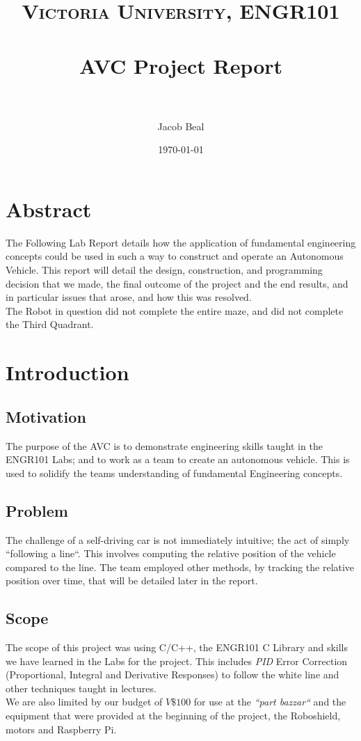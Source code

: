 \documentclass[paper=a4, fontsize=11pt]{scrartcl} %
\title{
\normalfont\normalsize
\textsc{Victoria University, ENGR101} \\ [25pt] %
\horrule{0.5pt} \\[0.4cm] %
\huge AVC Project Report\\ %
\horrule{2pt} \\[0.5cm] %
}
\author{Jacob Beal} %
\date{\normalsize\today} %
\numberwithin{equation}{section} %
\numberwithin{figure}{section} %
\begin{document}
\maketitle
\tableofcontents
\section{Abstract}
The Following Lab Report details how the application of fundamental engineering
concepts could be used in such a way to construct and operate an Autonomous
Vehicle. This report will detail the design, construction, and programming
decision that we made, the final outcome of the project and the end results,
and in particular issues that arose, and how this was resolved.\\

The Robot in question did not complete the entire maze, and did not complete the
Third Quadrant.
\section{Introduction}
\subsection{Motivation}
The purpose of the AVC is to demonstrate engineering skills taught in the
ENGR101 Labs; and to work as a team to create an autonomous vehicle. This is
used to solidify the teams understanding of fundamental Engineering concepts.
\subsection{Problem}
The challenge of a self-driving car is not immediately intuitive; the act of%
simply ``following a line``. This involves computing the relative position of
the vehicle compared to the line. The team employed other methods, by tracking
the relative position over time, that will be detailed later in the report.
\subsection{Scope}
The scope of this project was using C/C++, the ENGR101 C Library and skills we
have learned in the Labs for the project. This includes \textit{PID} Error
Correction (Proportional, Integral and Derivative Responses) to follow the 
white line and other techniques taught in lectures.\\
We are also limited by our budget of $V\$100$ for use at the \textit{``part
  bazzar``} and the equipment that were provided at the beginning of the
project, the Roboshield, motors and Raspberry Pi.
\end{document}
